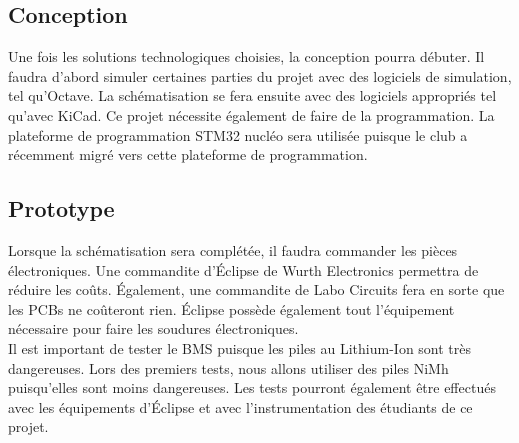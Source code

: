 \subsection{Conception}
Une fois les solutions technologiques choisies, la conception pourra débuter. Il faudra d’abord simuler certaines parties du projet avec des logiciels de simulation, tel qu’Octave. La schématisation se fera ensuite avec des logiciels appropriés tel qu’avec KiCad. Ce projet nécessite également de faire de la programmation. La plateforme de programmation STM32 nucléo sera utilisée puisque le club a récemment migré vers cette plateforme de programmation.

\subsection{Prototype}
Lorsque la schématisation sera complétée, il faudra commander les pièces électroniques. Une commandite d’Éclipse de Wurth Electronics permettra de réduire les coûts. Également, une commandite de Labo Circuits fera en sorte que les PCBs ne coûteront rien. Éclipse possède également tout l’équipement nécessaire pour faire les soudures électroniques. \\
 
Il est important de tester le BMS puisque les piles au Lithium-Ion sont très dangereuses. Lors des premiers tests, nous allons utiliser des piles NiMh puisqu’elles sont moins dangereuses. Les tests pourront également être effectués avec les équipements d’Éclipse et avec l’instrumentation des étudiants de ce projet.